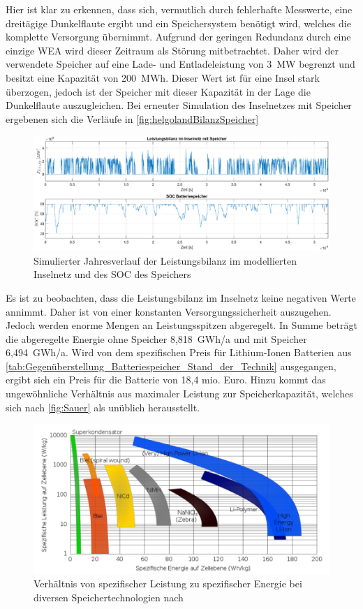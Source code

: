 Hier ist klar zu erkennen, dass sich, vermutlich durch fehlerhafte Messwerte, eine dreitägige Dunkelflaute ergibt und ein Speichersystem benötigt wird, welches die komplette Versorgung übernimmt. Aufgrund der geringen Redundanz durch eine einzige WEA wird dieser Zeitraum als Störung mitbetrachtet. Daher wird der verwendete Speicher auf eine Lade- und Entladeleistung von 3~MW begrenzt und besitzt eine Kapazität von 200~MWh. Dieser Wert ist für eine Insel stark überzogen, jedoch ist der Speicher mit dieser Kapazität in der Lage die Dunkelflaute auszugleichen. Bei erneuter Simulation des Inselnetzes mit Speicher ergebenen sich die Verläufe in \autoref{fig:helgolandBilanzSpeicher}

\begin{figure}[H]
	\centering
	\includegraphics[width=\linewidth]{Abbildungen/HelgolandSpeicher.eps}
	\caption{Simulierter Jahresverlauf der Leistungsbilanz im modellierten Inselnetz und des SOC des Speichers}
	\label{fig:helgolandBilanzSpeicher}
\end{figure}

Es ist zu beobachten, dass die Leistungsbilanz im Inselnetz keine negativen Werte annimmt. Daher ist von einer konstanten Versorgungssicherheit auszugehen. Jedoch werden enorme Mengen an Leistungsspitzen abgeregelt. In Summe beträgt die abgeregelte Energie ohne Speicher 8,818~GWh/a und  mit Speicher 6,494~GWh/a. Wird von dem spezifischen Preis für Lithium-Ionen Batterien aus \autoref{tab:Gegenüberstellung_Batteriespeicher_Stand_der_Technik} ausgegangen, ergibt sich ein Preis für die Batterie von 18,4 mio. Euro. Hinzu kommt das ungewöhnliche Verhältnis aus maximaler Leistung zur Speicherkapazität, welches sich nach \autoref{fig:Sauer} als unüblich herausstellt. 

\begin{figure}[H]
	\centering
	\includegraphics[width=0.8\linewidth]{Abbildungen/Spezifisch.png}
	\caption{Verhältnis von spezifischer Leistung zu spezifischer Energie bei diversen Speichertechnologien nach \cite{Sauer}}
	\label{fig:Sauer}
\end{figure}


